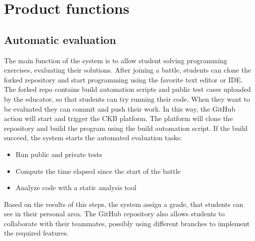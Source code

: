 \section{Product functions}
\subsection{Automatic evaluation}
The main function of the system is to allow student solving programming exercises, evaluating their solutions.
After joining a battle, students can clone the forked repository and start programming using the favorite text editor or IDE.
The forked repo contains build automation scripts and public test cases uploaded by the educator, so that students can try running their code.
When they want to be evaluated they can commit and push their work. In this way, the GitHub action will start and trigger the CKB platform.
The platform will clone the repository and build the program using the build automation script.
If the build succeed, the system starts the automated evaluation tasks:
\begin{itemize}
	\item Run public and private tests
	\item Compute the time elapsed since the start of the battle
	\item Analyze code with a static analysis tool
\end{itemize}
Based on the results of this steps, the system assign a grade, that students can see in their personal area.
The GitHub repository also allows students to collaborate with their teammates, possibly using different branches to implement the required features.
\begin{adjustbox}{
		max size={\textwidth}{},
		caption={Automatic evaluation activity diagram},
		label={fig:Automatic evaluation activity diagram},
		figure=H}
	\centering
\end{adjustbox}

\pagebreak

